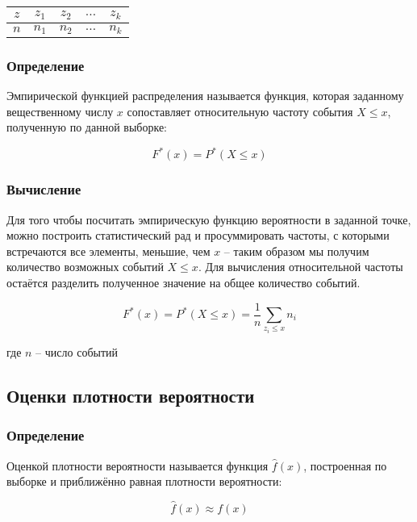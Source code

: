 \begin{tabular}{|c|c|c|c|c|}
	\hline
	$z$ & $z_1$ & $z_2$ & $\ldots$ & $z_k$ \\
	\hline
	$n$ & $n_1$ & $n_2$ & $\ldots$ & $n_k$ \\
	\hline
\end{tabular}

\subsubsection{Определение}
Эмпирической функцией распределения называется функция, которая заданному вещественному числу $x$ сопоставляет относительную частоту события $X \leq x$, полученную по данной выборке:

\begin{equation}\label{edf}
F^*(x)=P^*(X \leq x)
\end{equation}

\subsubsection{Вычисление}
Для того чтобы посчитать эмпирическую функцию вероятности в заданной точке, можно построить статистический рад и просуммировать частоты, с которыми встречаются все элементы, меньшие, чем $x$  -- таким образом мы получим количество возможных событий $X \leq x $. Для вычисления относительной частоты остаётся разделить полученное значение на общее количество событий.

\begin{equation}\label{edf}
F^*(x)=P^*(X \leq x) = \displaystyle \frac{1}{n}\sum_{z_i \leq x}{n_i}
\end{equation}

где $n$ -- число событий

\subsection{Оценки плотности вероятности}
\subsubsection{Определение}

Оценкой плотности вероятности называется функция $\hat{f}(x)$, построенная по выборке и приближённо равная плотности вероятности:

\begin{equation}
\hat{f}(x) \approx f(x)
\end{equation}

